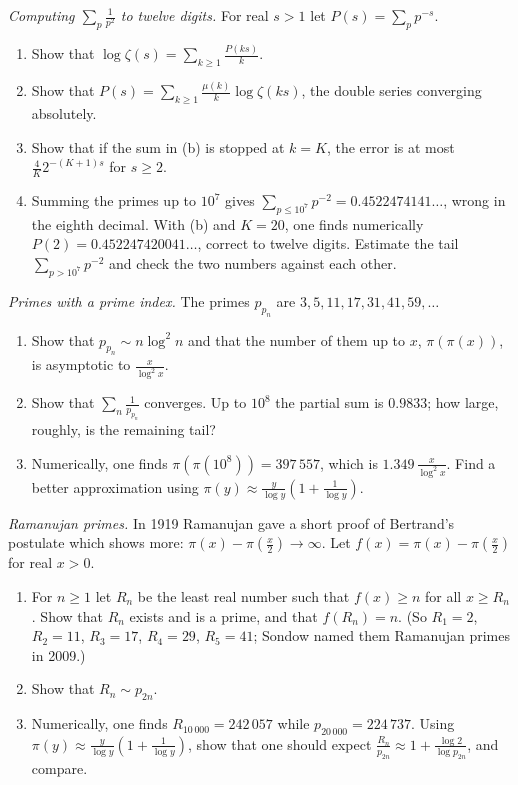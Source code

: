 \begin{exercise}[$\star\star$]\label{pb:primezeta}
\emph{Computing $\sum_p\frac1{p^2}$ to twelve digits.} For real $s>1$ let $P(s)=\sum_pp^{-s}$.
\begin{enumerate}[label=(\alph*)]
\item Show that $\log\zeta(s)=\sum_{k\ge1}\frac{P(ks)}k$.
\item Show that $P(s)=\sum_{k\ge1}\frac{\mu(k)}k\log\zeta(ks)$, the double series converging absolutely.
\item Show that if the sum in (b) is stopped at $k=K$, the error is at most $\frac{4}{K}2^{-(K+1)s}$ for $s\ge2$.
\item Summing the primes up to $10^7$ gives $\sum_{p\le10^7}p^{-2}=0.4522474141\ldots$, wrong in the eighth decimal. With (b) and $K=20$, one finds numerically
$P(2)=0.452247420041\ldots$, correct to twelve digits. Estimate the tail $\sum_{p>10^7}p^{-2}$ and check the two numbers against each other.
\end{enumerate}
\end{exercise}

\begin{exercise}[$\star$]\label{pb:superprimes}
\emph{Primes with a prime index.} The primes $p_{p_n}$ are $3,5,11,17,31,41,59,\dots$
\begin{enumerate}[label=(\alph*)]
\item Show that $p_{p_n}\sim n\log^2n$ and that the number of them up to $x$, $\pi(\pi(x))$, is asymptotic to $\frac x{\log^2x}$.
\item Show that $\sum_n\frac1{p_{p_n}}$ converges. Up to $10^8$ the partial sum is $0.9833$; how large, roughly, is the remaining tail?
\item Numerically, one finds $\pi(\pi(10^8))=397\,557$, which is $1.349\,\frac x{\log^2x}$. Find a better approximation using $\pi(y)\approx\frac y{\log y}(1+\frac1{\log y})$.
\end{enumerate}
\end{exercise}

\begin{exercise}[$\star\star$]\label{pb:ramprimes}
\emph{Ramanujan primes.} In 1919 Ramanujan gave a short proof of Bertrand's postulate which shows more: $\pi(x)-\pi(\frac x2)\to\infty$. Let $f(x)=\pi(x)-\pi(\frac x2)$ for real $x>0$.
\begin{enumerate}[label=(\alph*)]
\item For $n\ge1$ let $R_n$ be the least real number such that $f(x)\ge n$ for all $x\ge R_n$. Show that $R_n$ exists and is a prime, and that $f(R_n)=n$.
(So $R_1=2$, $R_2=11$, $R_3=17$, $R_4=29$, $R_5=41$; Sondow named them Ramanujan primes in 2009.)
\item Show that $R_n\sim p_{2n}$.
\item Numerically, one finds $R_{10\,000}=242\,057$ while $p_{20\,000}=224\,737$. Using $\pi(y)\approx\frac y{\log y}(1+\frac1{\log y})$, show that one should expect
$\frac{R_n}{p_{2n}}\approx1+\frac{\log2}{\log p_{2n}}$, and compare.
\end{enumerate}
\end{exercise}

